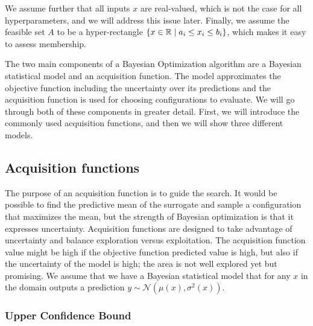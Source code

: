 
We assume further that all inputs $x$ are real-valued, which is not the case for all hyperparameters, and we will address this issue later. Finally, we assume the feasible set $A$ to be a hyper-rectangle $\{ x \in \mathbb{R} \mid a_i \leq x_i \leq b_i \}$, which makes it easy to assess membership.


The two main components of a Bayesian Optimization algorithm are a Bayesian statistical model and an acquisition function. The model approximates the objective function including the uncertainty over its predictions and the acquisition function is used for choosing configurations to evaluate. We will go through both of these components in greater detail. First, we will introduce the commonly used acquisition functions, and then we will show three different models.

\subsection{Acquisition functions}
The purpose of an acquisition function is to guide the search. It would be possible to find the predictive mean of the surrogate and sample a configuration that maximizes the mean, but the strength of Bayesian optimization is that it expresses uncertainty. Acquisition functions are designed to take advantage of uncertainty and balance exploration versus exploitation. The acquisition function value might be high if the objective function predicted value is high, but also if the uncertainty of the model is high; the area is not well explored yet but promising. We assume that we have a Bayesian statistical model that for any $x$ in the domain outputs a prediction $y \sim \mathcal{N}(\mu(x), \sigma^2(x))$.

\subsubsection{Upper Confidence Bound}

